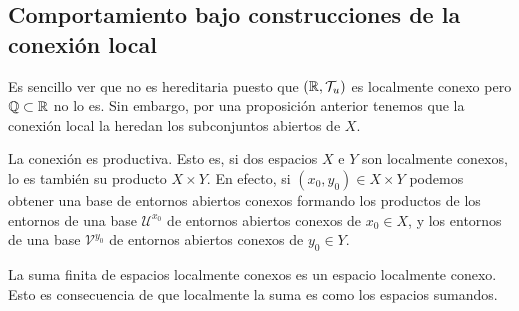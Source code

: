 \subsection{Comportamiento bajo construcciones de la conexión local}
\begin{observation}[No es hereditaria]
Es sencillo ver que no es hereditaria puesto que $\displaystyle \left(\mathbb{R}, \mathcal{T}_{u}\right) $ es localmente conexo pero $\displaystyle \mathbb{Q}\subset \mathbb{R} $ no lo es. Sin embargo, por una proposición anterior tenemos que la conexión local la heredan los subconjuntos abiertos de $\displaystyle X $.
\end{observation}
\begin{observation}[Sí es productiva]
La conexión es productiva. Esto es, si dos espacios $\displaystyle X $ e $\displaystyle Y $ son localmente conexos, lo es también su producto $\displaystyle X \times Y $. En efecto, si $\displaystyle \left(x_{0}, y_{0}\right)\in X \times Y $ podemos obtener una base de entornos abiertos conexos formando los productos de los entornos de una base $\displaystyle \mathcal{U}^{x_{0}} $ de entornos abiertos conexos de $\displaystyle x_{0}\in X $, y los entornos de una base $\displaystyle \mathcal{V}^{y_{0}} $ de entornos abiertos conexos de $\displaystyle y_{0}\in Y $.
\end{observation}

\begin{observation}[Sí es aditiva]
La suma finita de espacios localmente conexos es un espacio localmente conexo. Esto es consecuencia de que localmente la suma es como los espacios sumandos.
\end{observation}
 
